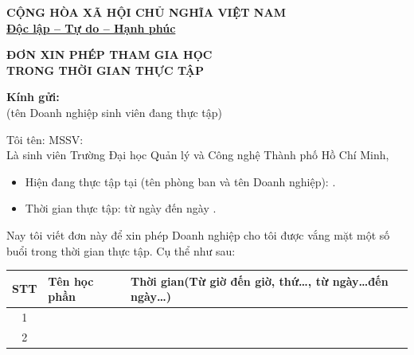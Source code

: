 \documentclass[12pt,a4paper]{article}
\newcommand{\densedotfill}{\leavevmode\cleaders\hbox{.\hspace{1.5pt}}\hfill\kern0pt}
\begin{document}
\begin{center}
    \textbf{CỘNG HÒA XÃ HỘI CHỦ NGHĨA VIỆT NAM}\\
    \textbf{\underline{Độc lập – Tự do – Hạnh phúc}}
\end{center}

\vspace{1em}

\begin{center}
    \textbf{\Large ĐƠN XIN PHÉP THAM GIA HỌC\\TRONG THỜI GIAN THỰC TẬP}
\end{center}

\vspace{1em}

\begin{center}
    \textbf{Kính gửi:} \makebox[0.6\textwidth]{\densedotfill}\\
    \small (tên Doanh nghiệp sinh viên đang thực tập)
\end{center}

\vspace{1em}

\noindent Tôi tên: \makebox[0.6\textwidth]{\densedotfill} MSSV: \makebox[0.2\textwidth]{\densedotfill}\\
\noindent Là sinh viên Trường Đại học Quản lý và Công nghệ Thành phố Hồ Chí Minh,\\
\begin{itemize}
    \item Hiện đang thực tập tại (tên phòng ban và tên Doanh nghiệp): \densedotfill
    \item Thời gian thực tập: từ ngày \makebox[3cm]{\densedotfill} đến ngày \densedotfill
\end{itemize}

\noindent Nay tôi viết đơn này để xin phép Doanh nghiệp cho tôi được vắng mặt một số buổi trong thời gian thực tập. Cụ thể như sau:

\vspace{0.5em}
\noindent
\begin{tabularx}{\textwidth}{|c|X|X|}
\hline
\textbf{STT} & \textbf{Tên học phần} & \textbf{Thời gian\newline (Từ giờ đến giờ, thứ…, từ ngày…đến ngày…)} \\ \hline
1 & & \\ \hline
2 & & \\ \hline
\end{tabularx}
\vspace{0.5em}
\end{document}
